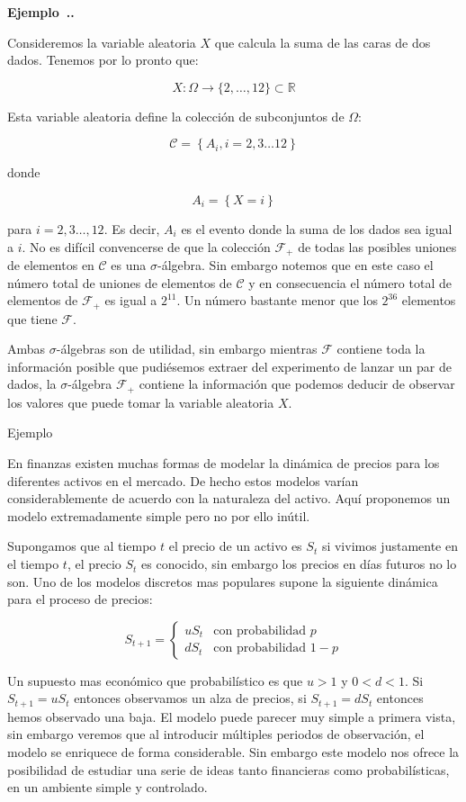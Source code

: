 \documentclass{extreport}
\newcounter{example}[chapter]
\newenvironment{example}[1][]{\refstepcounter{example}\par\medskip
   \noindent\textbf{Ejemplo~\thechapter.\theexample. #1 } \rmfamily\par\medskip}{\medskip}
\theoremstyle{definicion}
\theoremstyle{propiedad}
\begin{document}
\begin{example}
Consideremos la variable aleatoria $X$ que calcula la suma de las caras de dos dados. Tenemos por lo pronto que:    

$$
X:\Omega \rightarrow \{2,\ldots, 12\}\subset \mathbb{R}
$$

Esta variable aleatoria define la colección de subconjuntos de $\Omega$:

$$
\mathcal{C} = \left\{ {A}_i,i =2,3\ldots 12\right\}
$$

donde 

$$
A_i = \left\{X=i\right\}
$$

para $i=2,3\ldots, 12.$  Es decir, $A_i$ es el evento donde la suma de los dados sea igual a $i$. No es difícil convencerse de que la colección ${\mathcal F}_{+}$ de todas las posibles uniones de elementos en $\mathcal{C}$ es una $\sigma$-álgebra. Sin embargo notemos que en este caso el número total de uniones de elementos de $\mathcal C$ y en consecuencia el número total de elementos de $\mathcal F_+$ es igual a $2^{11}$. Un número bastante menor que los $2^{36}$ elementos que tiene $\mathcal F$.

Ambas $\sigma$-álgebras son de utilidad, sin embargo mientras $\mathcal{F}$ contiene toda la información posible que pudiésemos extraer del experimento de lanzar un par de dados, la $\sigma$-álgebra $\mathcal F_{+}$ contiene la información que podemos deducir de observar los valores que puede tomar la variable aleatoria $X$. 
\end{example}

Ejemplo

En finanzas existen muchas formas de modelar la dinámica de precios para los diferentes activos en el mercado. De hecho estos modelos varían considerablemente de acuerdo con la naturaleza del activo. Aquí proponemos un modelo extremadamente simple pero no por ello inútil.

Supongamos que al tiempo $t$ el precio de un activo es $S_t$   si vivimos justamente en el tiempo $t$, el precio $S_t$ es conocido, sin embargo los precios en días futuros no lo son. Uno de los modelos discretos mas populares supone la siguiente dinámica para el proceso de precios:

$$
S_{t+1} = \begin{cases}uS_t & \text{con probabilidad } p \\
dS_t & \text{con probabilidad } 1-p\end{cases}
$$

Un supuesto mas económico que probabilístico es que $u>1$ y $0< d < 1$.  Si $S_{t+1} = uS_t$ entonces observamos un alza de precios, si $S_{t+1} = dS_t$ entonces hemos observado una baja. El modelo puede parecer muy simple a primera vista, sin embargo veremos que al introducir múltiples periodos de observación, el modelo se enriquece de forma considerable. Sin embargo este modelo nos ofrece la posibilidad de estudiar una serie de ideas tanto financieras como probabilísticas, en un ambiente simple y controlado.
\end{document}
